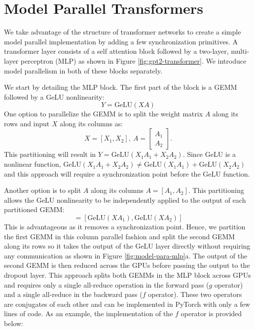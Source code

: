 \section{Model Parallel Transformers} 
\label{model_par}

We take advantage of the structure of transformer networks to create a simple model parallel implementation by adding a few synchronization primitives. A transformer layer consists of a self attention block followed by a two-layer, multi-layer perceptron (MLP) as shown in Figure \ref{fig:gpt2-transformer}. We introduce model parallelism in both of these blocks separately.

 We start by detailing the MLP block. The first part of the block is a GEMM followed by a GeLU nonlinearity:
 \begin{equation}
    Y = \textrm{GeLU}(XA)
    \label{eq:mlp-firstgemm}
 \end{equation}
 One option to parallelize the GEMM is to split the weight matrix $A$ along its rows and input $X$ along its columns as:
 \begin{equation}
    X = [X_1, X_2], \
    A=\begin{bmatrix}
        A_1 \\
        A_2
    \end{bmatrix}.
 \end{equation}
 This partitioning will result in $Y = \textrm{GeLU}(X_1A_1 + X_2A_2)$. Since GeLU is a nonlinear function, $\textrm{GeLU}(X_1A_1 + X_2A_2)\neq \textrm{GeLU}(X_1A_1)+\textrm{GeLU}(X_2A_2)$ and this approach will require a synchronization point before the GeLU function. 
 
 Another option is to split $A$ along its columns $A=[A_1, A_2]$. This partitioning allows the GeLU nonlinearity to be independently applied to the output of each partitioned GEMM:
 \begin{equation}
    [Y_1, Y_2]= [\textrm{GeLU}(XA_1), \textrm{GeLU}(XA_2)] 
 \end{equation}
 This is advantageous as it removes a synchronization point. Hence, we partition the first GEMM in this column parallel fashion and split the second GEMM along its rows so it takes the output of the GeLU layer directly without requiring any communication as shown in Figure \ref{fig:model-para-mlp}a. The output of the second GEMM is then reduced across the GPUs before passing the output to the dropout layer. This approach splits both GEMMs in the MLP block across GPUs and requires only a single all-reduce operation in the forward pass ($g$ operator) and a single all-reduce in the backward pass ($f$ operator). These two operators are conjugates of each other and can be implemented in PyTorch with only a few lines of code. As an example, the implementation of the $f$ operator is provided below:

